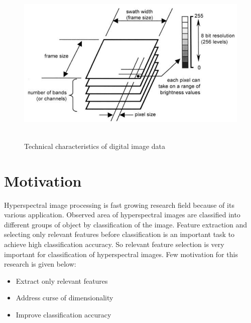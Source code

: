 \documentclass[document.tex]{subfiles}
\begin{document}
\begin{figure}[H]
	\begin{center}
		\includegraphics[height=8.0cm]{imgs/capture.png}
	\end{center}
	\caption{Technical characteristics of
		digital image data\cite{3}}
	\label{fig: Technical characteristics of
		digital image data}
\end{figure}

 



\section{Motivation}
\noindent Hyperspectral image processing is fast growing research field because of its various application. Observed area of hyperspectral images are classified into different groups of object by classification of the image. Feature extraction and selecting only relevant features before classification is an important task to achieve high classification accuracy. So relevant feature selection is very important for classification of hyperspectral images. Few motivation for this research is given below:
\begin{itemize}
	\item Extract only relevant features
	\item Address curse of dimensionality
	\item Improve classification accuracy
\end{itemize}
\end{document}
